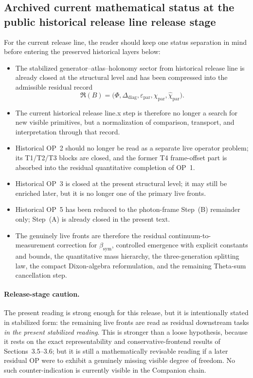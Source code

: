 \documentclass[12pt,a4paper]{article}
\DeclareRobustCommand{\QSCver}[1]{archival stage}
\newcommand{\bsym}{\beta_{\mathrm{sym}}}
\renewcommand{\QSCver}[1]{historical release line}
\begin{document}
\subsection*{Archived current mathematical status at the public \QSCver{legacy.13.0} release stage}
For the current release line, the reader should keep one status separation in mind before entering the preserved historical layers below:
\begin{itemize}[leftmargin=2em]
 \item The stabilized generator--atlas--holonomy sector from historical release line is already closed at the structural level and has been compressed into the admissible residual record
 \[
 \mathfrak R(B)=\bigl(\Phi,\Delta_{\mathrm{diag}},\varepsilon_{\mathrm{par}},\chi_{\mathrm{par}},\widehat\chi_{\mathrm{par}}\bigr).
 \]
 \item The current historical release line.x step is therefore no longer a search for new visible primitives, but a normalization of comparison, transport, and interpretation through that record.
 \item Historical OP~2 should no longer be read as a separate live operator problem; its T1/T2/T3 blocks are closed, and the former T4 frame-offset part is absorbed into the residual quantitative completion of OP~1.
 \item Historical OP~3 is closed at the present structural level; it may still be enriched later, but it is no longer one of the primary live fronts.
 \item Historical OP~5 has been reduced to the photon-frame Step~(B) remainder only; Step~(A) is already closed in the present text.
 \item The genuinely live fronts are therefore the residual continuum-to-measurement correction for \(\bsym\), controlled emergence with explicit constants and bounds, the quantitative mass hierarchy, the three-generation splitting law, the compact Dixon-algebra reformulation, and the remaining Theta-sum cancellation step.
\end{itemize}

\paragraph{Release-stage caution.}
The present reading is strong enough for this release, but it is intentionally stated in stabilized form: the remaining live fronts are read as residual downstream tasks \emph{in the present stabilized reading}. This is stronger than a loose hypothesis, because it rests on the exact representability and conservative-frontend results of Sections~3.5--3.6; but it is still a mathematically revisable reading if a later residual OP were to exhibit a genuinely missing visible degree of freedom. No such counter-indication is currently visible in the Companion chain.
\end{document}
